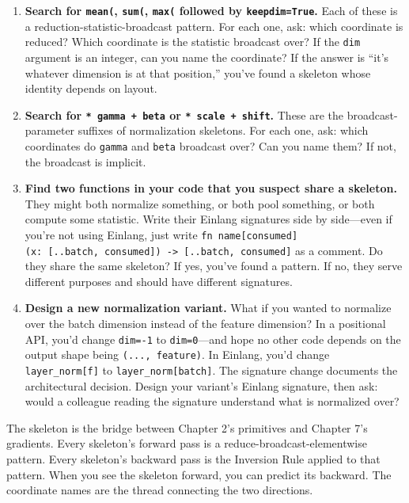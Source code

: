 \documentclass[11pt,titlepage]{article}
\begin{document}
\begin{enumerate}
\def\labelenumi{\arabic{enumi}.}
\item
  \textbf{Search for \texttt{mean(}, \texttt{sum(}, \texttt{max(}
  followed by \texttt{keepdim=True}.} Each of these is a
  reduction-statistic-broadcast pattern. For each one, ask: which
  coordinate is reduced? Which coordinate is the statistic broadcast
  over? If the \texttt{dim} argument is an integer, can you name the
  coordinate? If the answer is ``it's whatever dimension is at that
  position,'' you've found a skeleton whose identity depends on layout.
\item
  \textbf{Search for \texttt{*\ gamma\ +\ beta} or
  \texttt{*\ scale\ +\ shift}.} These are the broadcast-parameter
  suffixes of normalization skeletons. For each one, ask: which
  coordinates do \texttt{gamma} and \texttt{beta} broadcast over? Can
  you name them? If not, the broadcast is implicit.
\item
  \textbf{Find two functions in your code that you suspect share a
  skeleton.} They might both normalize something, or both pool
  something, or both compute some statistic. Write their Einlang
  signatures side by side---even if you're not using Einlang, just write
  \texttt{fn\ name{[}consumed{]}(x:\ {[}..batch,\ consumed{]})\ -\textgreater{}\ {[}..batch,\ consumed{]}}
  as a comment. Do they share the same skeleton? If yes, you've found a
  pattern. If no, they serve different purposes and should have
  different signatures.
\item
  \textbf{Design a new normalization variant.} What if you wanted to
  normalize over the batch dimension instead of the feature dimension?
  In a positional API, you'd change \texttt{dim=-1} to
  \texttt{dim=0}---and hope no other code depends on the output shape
  being \texttt{(...,\ feature)}. In Einlang, you'd change
  \texttt{layer\_norm{[}f{]}} to \texttt{layer\_norm{[}batch{]}}. The
  signature change documents the architectural decision. Design your
  variant's Einlang signature, then ask: would a colleague reading the
  signature understand what is normalized over?
\end{enumerate}

The skeleton is the bridge between Chapter 2's primitives and Chapter
7's gradients. Every skeleton's forward pass is a
reduce-broadcast-elementwise pattern. Every skeleton's backward pass is
the Inversion Rule applied to that pattern. When you see the skeleton
forward, you can predict its backward. The coordinate names are the
thread connecting the two directions.
\end{document}
